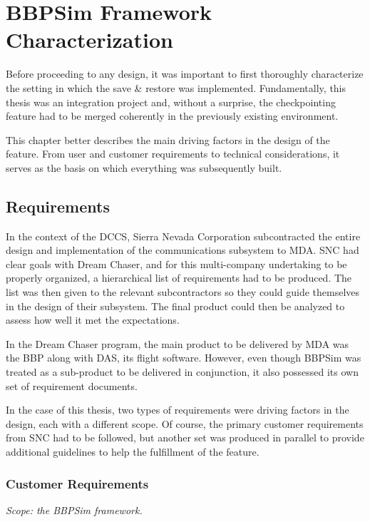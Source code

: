 {
\setlength{\parindent}{2em}
\chapter{BBPSim Framework Characterization}\label{cha:sim-env}
Before proceeding to any design, it was important to first thoroughly characterize the setting in which the save \& restore was implemented. Fundamentally, this thesis was an integration project and, without a surprise, the checkpointing feature had to be merged coherently in the previously existing environment.

This chapter better describes the main driving factors in the design of the feature. From user and customer requirements to technical considerations, it serves as the basis on which everything was subsequently built.

\section{Requirements}\label{sec:reqs}
In the context of the \gls{DCCS}, Sierra Nevada Corporation subcontracted the entire design and implementation of the communications subsystem to \gls{MDA}. \gls{SNC} had clear goals with Dream Chaser, and for this multi-company undertaking to be properly organized, a hierarchical list of requirements had to be produced. The list was then given to the relevant subcontractors so they could guide themselves in the design of their subsystem. The final product could then be analyzed to assess how well it met the expectations. 

In the Dream Chaser program, the main product to be delivered by \gls{MDA} was the \gls{BBP} along with \gls{DAS}, its flight software. However, even though \gls{BBPSim} was treated as a sub-product to be delivered in conjunction, it also possessed its own set of requirement documents.

In the case of this thesis, two types of requirements were driving factors in the design, each with a different scope. Of course, the primary customer requirements from \gls{SNC} had to be followed, but another set was produced in parallel to provide additional guidelines to help the fulfillment of the feature.  

\subsection*{Customer Requirements}
\textit{Scope: the {BBPSim} framework.}

}
